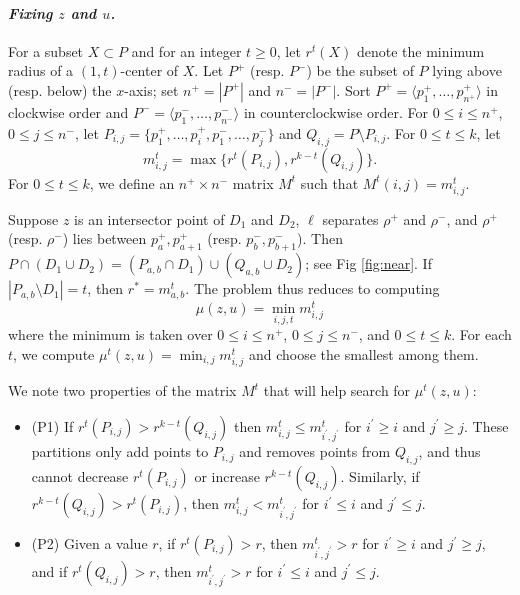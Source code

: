 \documentclass[11pt]{myclass}
\begin{document}
\paragraph{\textbf{\emph{Fixing $z$ and $u$.}}}
For a subset $X \subset P$ and for an integer $t\geq 0$, let $r^t(X)$ denote the minimum radius of a $(1,t)$-center of $X$.  Let $P^+$ (resp. $P^-$) be the subset of $P$ lying above (resp. below) the $x$-axis; set $n^+ = |P^+|$ and $n^- = |P^-|$.  Sort $P^+ = \langle p_1^+, \ldots, p_{n^+}^+\rangle$ in clockwise order and $P^- = \langle p_1^-, \ldots, p_{n^-}^- \rangle$ in counterclockwise order.  
For $0 \leq i \leq n^+$, $0 \leq j \leq n^-$, let $P_{i,j} = \{p_1^+, \ldots, p_i^+, p_1^-, \ldots, p_j^- \}$ and $Q_{i,j} = P \setminus P_{i,j}$.  
For $0 \leq t \leq k$, let 
$$
m_{i,j}^t = \max \{ r^t(P_{i,j}), r^{k-t}(Q_{i,j}) \}.
$$
For $0 \leq t \leq k$, we define an $n^+ \times n^-$ matrix $M^t$ such that $M^t(i,j) = m^t_{i,j}$.  

Suppose $z$ is an intersector point of $D_1$ and $D_2$, $\ell$ separates $\rho^+$ and $\rho^-$, and $\rho^+$ (resp. $\rho^-$) lies between $p_a^+, p_{a+1}^+$ (resp. $p_b^-, p_{b+1}^-$).  Then $P \cap (D_1 \cup D_2) = (P_{a,b} \cap D_1) \cup (Q_{a,b} \cup D_2)$; see Fig \ref{fig:near}.  
If $|P_{a,b} \setminus D_1| = t$, then $r^* = m^t_{a,b}$.  
The problem thus reduces to computing 
$$
\mu(z,u) = \min_{i,j,t} m^t_{i,j}
$$
where the minimum is taken over $0 \leq i \leq n^+$, $0 \leq j \leq n^-$, and $0 \leq t \leq k$.  For each $t$, we compute $\mu^t(z,u) = \min_{i,j} m^t_{i,j}$ and choose the smallest among them.  

We note two properties of the matrix $M^t$ that will help search for $\mu^t(z,u)$:

\begin{itemize}
\item{(P1)} 
If $r^t(P_{i,j}) > r^{k-t}(Q_{i,j})$ then $m^t_{i,j} \leq m^t_{i^\prime,j^\prime}$ for $i^\prime \geq i$ and $j^\prime \geq j$.  These partitions only add points to $P_{i,j}$ and removes points from $Q_{i,j}$, and thus cannot decrease $r^t(P_{i,j})$ or increase $r^{k-t}(Q_{i,j})$.  
Similarly, if $r^{k-t}(Q_{i,j}) > r^t(P_{i,j})$, then $m^t_{i,j} < m^t_{i^\prime, j^\prime}$ for $i^\prime \leq i$ and $j^\prime \leq j$. 
\item{(P2)} Given a value $r$, if $r^t(P_{i,j}) > r$, then $m^t_{i^\prime,j^\prime} > r$ for $i^\prime \geq i$ and $j^\prime \geq j$, and if $r^t(Q_{i,j}) > r$, then $m^t_{i^\prime,j^\prime} > r$ for $i^\prime \leq i$ and $j^\prime \leq j$.
\end{itemize}
\end{document}
